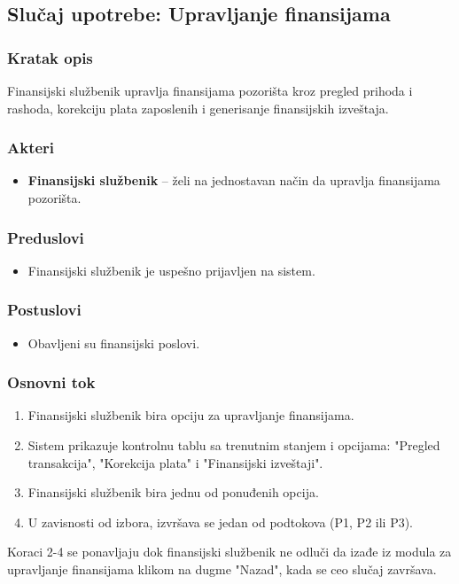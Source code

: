 \subsection{Slučaj upotrebe: Upravljanje finansijama}

\subsubsection*{Kratak opis}
Finansijski službenik upravlja finansijama pozorišta kroz pregled prihoda i rashoda, korekciju plata zaposlenih i generisanje finansijskih izveštaja.

\subsubsection*{Akteri}
\begin{itemize}
    \item \textbf{Finansijski službenik} -- želi na jednostavan način da upravlja finansijama pozorišta.
\end{itemize}

\subsubsection*{Preduslovi}
\begin{itemize}
    \item Finansijski službenik je uspešno prijavljen na sistem.
\end{itemize}

\subsubsection*{Postuslovi}
\begin{itemize}
    \item Obavljeni su finansijski poslovi.
\end{itemize}

\subsubsection*{Osnovni tok}
\begin{enumerate}
    \item Finansijski službenik bira opciju za upravljanje finansijama.
    \item Sistem prikazuje kontrolnu tablu sa trenutnim stanjem i opcijama: "Pregled transakcija", "Korekcija plata" i "Finansijski izveštaji".
    \item Finansijski službenik bira jednu od ponuđenih opcija.
    \item U zavisnosti od izbora, izvršava se jedan od podtokova (P1, P2 ili P3).
\end{enumerate}
Koraci 2-4 se ponavljaju dok finansijski službenik ne odluči da izađe iz modula za upravljanje finansijama klikom na dugme "Nazad", kada se ceo slučaj završava.

